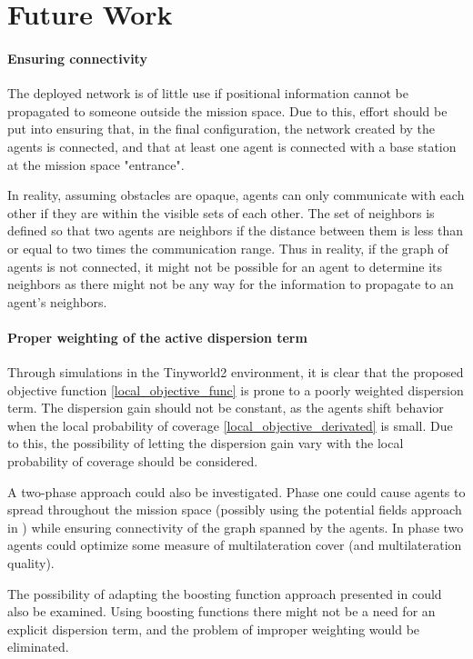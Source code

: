 \section{Future Work}
\paragraph{Ensuring connectivity}
The deployed network is of little use if positional information cannot be propagated to someone outside the mission space.
Due to this, effort should be put into ensuring that, in the final configuration, the network created by the agents 
is connected, and that at least one agent is connected with a base station at the mission space "entrance".

In reality, assuming obstacles are opaque, agents can only communicate with each other if they are within the visible sets of each other. 
The set of neighbors is defined so that two agents are neighbors if the distance between them is less than or equal to two times the communication range.
Thus in reality, if the graph of agents is not connected, it might not be possible for an agent to determine its neighbors as there might not be any way for 
the information to propagate to an agent's neighbors.

\paragraph{Proper weighting of the active dispersion term}
Through simulations in the Tinyworld2 environment, it is clear that the proposed objective function \eqref{local_objective_func} is 
prone to a poorly weighted dispersion term. The dispersion gain should not be constant, 
as the agents shift behavior when the local probability of coverage \eqref{local_objective_derivated} is small. Due to this,
the possibility of letting the dispersion gain vary with the local probability of coverage should be considered. 

A two-phase 
approach could also be investigated. Phase one could cause agents to spread throughout the mission space (possibly using the potential fields
approach in \cite{pot_field}) while ensuring connectivity of the graph spanned by the agents. In phase two agents could optimize some
measure of multilateration cover (and multilateration quality).

The possibility of adapting the boosting function approach presented in \cite{sun2014escaping} could also be examined. Using boosting
functions there might not be a need for an explicit dispersion term, and the problem of improper weighting would be eliminated.

